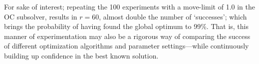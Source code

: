 \documentclass[11pt]{article}
\begin{document}
For sake of interest; repeating the 100 experiments with a move-limit of 1.0 in the OC subsolver, results in $r = 60$, almost double the number of `successes'; which brings the probability of having found the global optimum to 99\%. That is, this manner of experimentation may also be a rigorous way of comparing the success of different optimization algorithms and parameter settings---while continuously building up confidence in the best known solution. 

 
 
\end{document}

